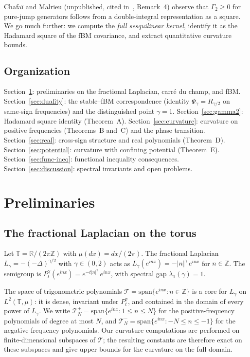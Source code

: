 \documentclass[11pt,a4paper]{article}
\theoremstyle{plain}
\theoremstyle{definition}
\theoremstyle{remark}
\newcommand{\R}{\mathbb{R}}
\newcommand{\Z}{\mathbb{Z}}
\newcommand{\T}{\mathbb{T}}
\begin{document}
Chafa\"i and Malrieu (unpublished, cited in~\cite{GentilImbert2008},
Remark~4) observe that $\Gamma_2 \geq 0$ for pure-jump generators
follows from a double-integral representation as a square. We go
much further: we compute the \emph{full sesquilinear kernel}, identify
it as the Hadamard square of the fBM covariance, and extract
quantitative curvature bounds.


\subsection{Organization}

Section~\ref{sec:prelim}: preliminaries on the fractional Laplacian,
carr\'e du champ, and fBM.
Section~\ref{sec:duality}: the stable--fBM correspondence (identity
$\Psi_\gamma = R_{\gamma/2}$ on same-sign frequencies) and the distinguished point $\gamma = 1$.
Section~\ref{sec:gamma2}: Hadamard square identity (Theorem~A).
Section~\ref{sec:curvature}: curvature on positive frequencies
(Theorems~B and~C) and the phase transition.
Section~\ref{sec:real}: cross-sign structure and real polynomials
(Theorem~D).
Section~\ref{sec:potential}: curvature with confining potential
(Theorem~E).
Section~\ref{sec:func-ineq}: functional inequality consequences.
Section~\ref{sec:discussion}: spectral invariants and open problems.


\section{Preliminaries}\label{sec:prelim}

\subsection{The fractional Laplacian on the torus}

Let $\T = \R/(2\pi\Z)$ with $\mu(dx) = dx/(2\pi)$. The fractional
Laplacian $L_\gamma = -(-\Delta)^{\gamma/2}$ with $\gamma \in (0,2)$
acts as $L_\gamma(e^{inx}) = -|n|^\gamma\,e^{inx}$ for $n \in \Z$.
The semigroup is $P_t^\gamma(e^{inx}) = e^{-t|n|^\gamma}\,e^{inx}$,
with spectral gap $\lambda_1(\gamma) = 1$.

The space of trigonometric polynomials
$\mathcal{T} = \mathrm{span}\{e^{inx} : n \in \Z\}$ is a core
for $L_\gamma$ on $L^2(\T,\mu)$: it is dense, invariant under $P_t^\gamma$,
and contained in the domain of every power of $L_\gamma$.
We write $\mathcal{T}_N^+ = \mathrm{span}\{e^{inx} : 1 \leq n \leq N\}$
for the positive-frequency polynomials of degree at most $N$,
and $\mathcal{T}_N^- = \mathrm{span}\{e^{inx} : -N \leq n \leq -1\}$
for the negative-frequency polynomials.
Our curvature computations are performed on finite-dimensional
subspaces of $\mathcal{T}$; the resulting constants are therefore
exact on these subspaces and give upper bounds for the curvature
on the full domain.
\end{document}
